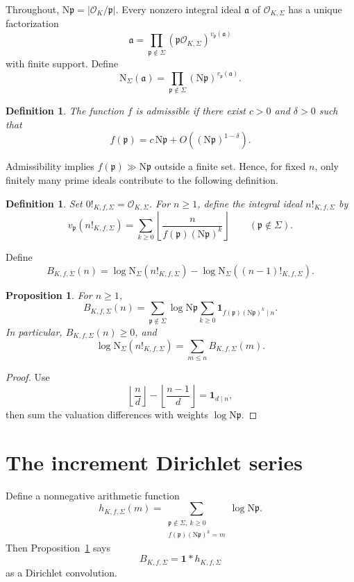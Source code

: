 \documentclass[11pt]{article}
\newtheorem{proposition}[theorem]{Proposition}
\newtheorem{definition}[theorem]{Definition}
\newcommand{\OK}{\mathcal O_K}
\newcommand{\OKS}{\mathcal O_{K,\Sigma}}
\newcommand{\Norm}{\mathrm N}
\begin{document}
Throughout, \(\Norm\mathfrak p=|\OK/\mathfrak p|\).  Every nonzero
integral ideal \(\mathfrak a\) of \(\OKS\) has a unique factorization
\[
\mathfrak a
=
\prod_{\mathfrak p\notin\Sigma}
(\mathfrak p\OKS)^{v_{\mathfrak p}(\mathfrak a)}
\]
with finite support.  Define
\[
\Norm_\Sigma(\mathfrak a)
=
\prod_{\mathfrak p\notin\Sigma}
(\Norm\mathfrak p)^{v_{\mathfrak p}(\mathfrak a)}.
\]

\begin{definition}
The function \(f\) is \emph{admissible} if there exist \(c>0\) and
\(\delta>0\) such that
\[
f(\mathfrak p)
=
c\,\Norm\mathfrak p
+
O\!\left((\Norm\mathfrak p)^{1-\delta}\right).
\]
\end{definition}

Admissibility implies \(f(\mathfrak p)\gg\Norm\mathfrak p\) outside a
finite set.  Hence, for fixed \(n\), only finitely many prime ideals
contribute to the following definition.

\begin{definition}
Set \(0!_{K,f,\Sigma}=\OKS\).  For \(n\ge 1\), define the integral ideal
\(n!_{K,f,\Sigma}\) by
\[
v_{\mathfrak p}(n!_{K,f,\Sigma})
=
\sum_{k\ge 0}
\left\lfloor
\frac{n}{f(\mathfrak p)(\Norm\mathfrak p)^k}
\right\rfloor
\qquad(\mathfrak p\notin\Sigma).
\]
\end{definition}

Define
\[
B_{K,f,\Sigma}(n)
=
\log\Norm_\Sigma(n!_{K,f,\Sigma})
-
\log\Norm_\Sigma((n-1)!_{K,f,\Sigma}).
\]

\begin{proposition}\label{prop:increment}
For \(n\ge1\),
\[
B_{K,f,\Sigma}(n)
=
\sum_{\mathfrak p\notin\Sigma}
\log\Norm\mathfrak p
\sum_{k\ge0}
\mathbf 1_{
f(\mathfrak p)(\Norm\mathfrak p)^k\mid n}.
\]
In particular, \(B_{K,f,\Sigma}(n)\ge0\), and
\[
\log\Norm_\Sigma(n!_{K,f,\Sigma})
=
\sum_{m\le n}B_{K,f,\Sigma}(m).
\]
\end{proposition}

\begin{proof}
Use
\[
\left\lfloor\frac{n}{d}\right\rfloor
-
\left\lfloor\frac{n-1}{d}\right\rfloor
=
\mathbf 1_{d\mid n},
\]
then sum the valuation differences with weights
\(\log\Norm\mathfrak p\).
\end{proof}

\section{The increment Dirichlet series}

Define a nonnegative arithmetic function
\[
h_{K,f,\Sigma}(m)
=
\sum_{\substack{\mathfrak p\notin\Sigma,\ k\ge0\\
f(\mathfrak p)(\Norm\mathfrak p)^k=m}}
\log\Norm\mathfrak p.
\]
Then Proposition~\ref{prop:increment} says
\[
B_{K,f,\Sigma}=\mathbf 1*h_{K,f,\Sigma}
\]
as a Dirichlet convolution.
\end{document}
